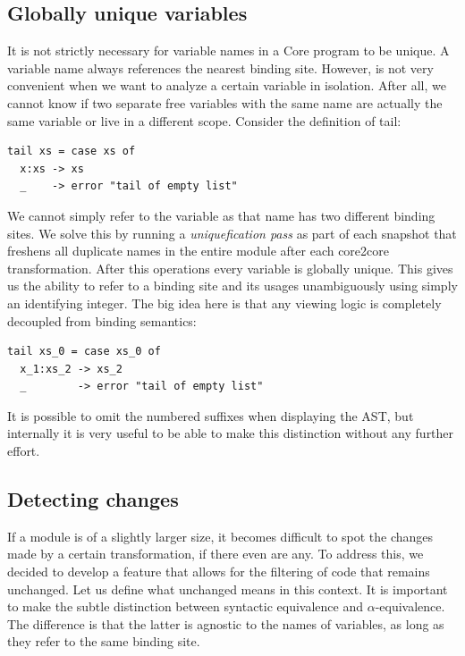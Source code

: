 \subsection{Globally unique variables}

It is not strictly necessary for variable names in a Core program to be unique. A variable name always
references the nearest binding site. However, is not very convenient
when we want to analyze a certain variable in isolation. After all, we cannot know if two separate free variables
with the same name are actually the same variable or live in a different scope. Consider the definition of tail:

\begin{listing}[H]
\begin{verbatim}
tail xs = case xs of
  x:xs -> xs
  _    -> error "tail of empty list"
\end{verbatim}
\end{listing}

We cannot simply refer to the variable  as that name has two different binding sites.
We solve this by running a \textit{uniquefication pass} as part of each snapshot that freshens all duplicate names in the entire
module after each core2core transformation. After this operations every variable is globally unique. 
This gives us the ability to refer to a binding site and its usages unambiguously using simply an identifying integer.
The big idea here is that any viewing logic is completely decoupled from binding semantics:

\begin{listing}[H]
\begin{verbatim}
tail xs_0 = case xs_0 of
  x_1:xs_2 -> xs_2
  _        -> error "tail of empty list"
\end{verbatim}
\end{listing}

It is possible to omit the numbered suffixes when displaying the AST, but internally it is very useful to be able to make
this distinction without any further effort.

\subsection{Detecting changes}

If a module is of a slightly larger size, it becomes difficult to spot the changes made by a certain
transformation, if there even are any. To address this, we decided to develop a feature that allows for
the filtering of code that remains unchanged. Let us define what unchanged means in this context. It is
important to make the subtle distinction between syntactic equivalence and $\alpha$-equivalence. The difference
is that the latter is agnostic to the names of variables, as long as they refer to the same binding site.

